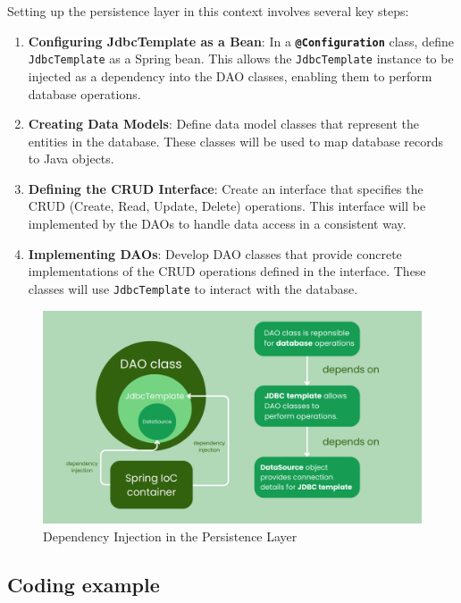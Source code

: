 \documentclass{article}
\begin{document}
Setting up the persistence layer in this context involves several key steps:

\begin{enumerate}
    \item \textbf{Configuring JdbcTemplate as a Bean}: In a \textbf{\texttt{@Configuration}} class, define \texttt{JdbcTemplate} as a Spring bean. This allows the \texttt{JdbcTemplate} instance to be injected as a dependency into the DAO classes, enabling them to perform database operations.

    \item \textbf{Creating Data Models}: Define data model classes that represent the entities in the database. These classes will be used to map database records to Java objects.

    \item \textbf{Defining the CRUD Interface}: Create an interface that specifies the CRUD (Create, Read, Update, Delete) operations. This interface will be implemented by the DAOs to handle data access in a consistent way.

    \item \textbf{Implementing DAOs}: Develop DAO classes that provide concrete implementations of the CRUD operations defined in the interface. These classes will use \texttt{JdbcTemplate} to interact with the database.
\end{enumerate}

\begin{figure}[H]
    \centering
    \begin{framed}
        \includegraphics[width=0.8\linewidth]{images/minimalistic_jdbctemplate.png}
    \end{framed}
    \caption{Dependency Injection in the Persistence Layer}
    \label{fig:spring-logo}
\end{figure}

\subsection{Coding example}
\end{document}
